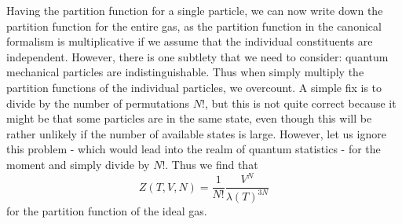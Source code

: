 \documentclass[a4paper, draft]{article}
\theoremstyle{own}
\theoremstyle{remark}
\begin{document}
Having the partition function for a single particle, we can now write down the partition function for the entire gas, as the partition function in the canonical formalism is multiplicative if we assume that the individual constituents are independent. However, there is one subtlety that we need to consider: quantum mechanical particles are indistinguishable. Thus when simply multiply the partition functions of the individual particles, we overcount. A simple fix is to divide by the number of permutations $N!$, but this is not quite correct because it might be that some particles are in the same state, even though this will be rather unlikely if the number of available states is large. However, let us ignore this problem - which would lead into the realm of quantum statistics - for the moment and simply divide by $N!$. Thus we find that
$$
Z(T,V,N) = \frac{1}{N!} \frac{V^N}{\lambda(T)^{3N}}
$$
for the partition function of the ideal gas. 
\end{document}
